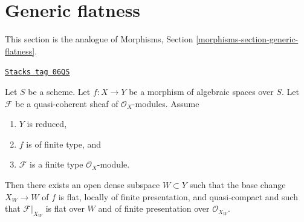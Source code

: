 \section{Generic flatness}
\label{spaces-morphisms-section-generic-flatness}
This section is the analogue of
Morphisms, Section \ref{morphisms-section-generic-flatness}.

\begin{proposition}
\label{spaces-morphisms-proposition-generic-flatness-reduced}
\href{https://stacks.math.columbia.edu/tag/06QS}{\texttt{Stacks tag 06QS}}

Let $S$ be a scheme.
Let $f : X \to Y$ be a morphism of algebraic spaces over $S$.
Let $\mathcal{F}$ be a quasi-coherent sheaf of $\mathcal{O}_X$-modules.
Assume
\begin{enumerate}
\item $Y$ is reduced,
\item $f$ is of finite type, and
\item $\mathcal{F}$ is a finite type $\mathcal{O}_X$-module.
\end{enumerate}
Then there exists an open dense subspace $W \subset Y$ such that
the base change $X_W \to W$ of $f$ is flat, locally of finite presentation, and
quasi-compact and such that $\mathcal{F}|_{X_W}$ is flat over $W$ and of
finite presentation over $\mathcal{O}_{X_W}$.
\end{proposition}

